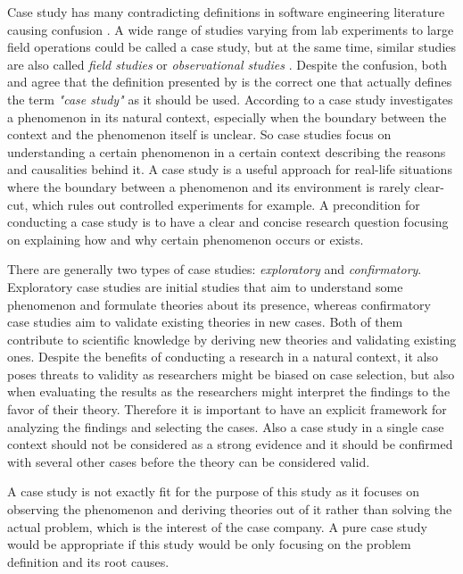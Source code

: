 Case study has many contradicting definitions in software engineering literature causing confusion \citep{Easterbrook2008}\citep{Runeson2009}\citep{Runeson2012}.
A wide range of studies varying from lab experiments to large field operations could be called a case study, but at the same time, similar studies are also called
\emph{field studies} or \emph{observational studies} \citep{Runeson2012}. Despite the confusion, both \citet{Easterbrook2008} and \citet{Runeson2009}
agree that the definition presented by \citet[p.~13]{Yin2003} is the correct one that actually defines the term \emph{"case study"} as it should be used.
According to \citet[p.~13]{Yin2003} a case study
investigates a phenomenon in its natural context, especially when the boundary between the context and the phenomenon itself is unclear. So case studies focus on understanding a certain
phenomenon in a certain context describing the reasons and causalities behind it. A case study is a useful approach for real-life situations where the boundary between
a phenomenon and its environment is rarely clear-cut, which rules out controlled experiments for example. A precondition for conducting a case study is to have a clear and
concise research question focusing on explaining how and why certain phenomenon occurs or exists. \citep{Easterbrook2008}

There are generally two types of case studies:
\emph{exploratory} and \emph{confirmatory}. Exploratory case studies are initial studies that aim to understand some phenomenon and formulate theories about its
presence, whereas confirmatory case studies aim to validate existing theories in new cases. Both of them contribute to scientific knowledge by deriving new
theories and validating existing ones. Despite the benefits of conducting a research in a natural context, it also poses threats to validity as researchers might be biased on 
case selection, but also when evaluating the results as the researchers might interpret the findings to the favor of their theory. Therefore it is important to have
an explicit framework for analyzing the findings and selecting the cases. Also a case study in a single case context should not be considered as a strong evidence and it should be
confirmed with several other cases before the theory can be considered valid. \citep{Easterbrook2008}

A case study is not exactly fit for the purpose of this
study as it focuses on observing the phenomenon and deriving theories out of it rather than solving the actual problem, which is the interest of the case company. A pure case study
would be appropriate if this study would be only focusing on the problem definition and its root causes.

